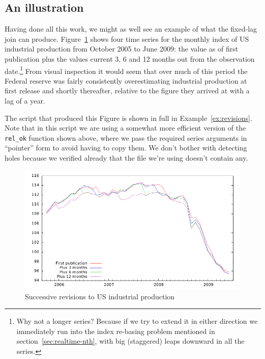 \subsection{An illustration}

Having done all this work, we might as well see an example of what the
fixed-lag join can produce.  Figure~\ref{fig:realtime-lag} shows four
time series for the monthly index of US industrial production from
October 2005 to June 2009: the value as of first publication plus the
values current 3, 6 and 12 months out from the observation
date.\footnote{Why not a longer series? Because if we try to extend it
  in either direction we immediately run into the index re-basing
  problem mentioned in section~\ref{sec:realtime-nth}, with big
  (staggered) leaps downward in all the series.} From visual
inspection it would seem that over much of this period the Federal
reserve was fairly consistently overestimating industrial production
at first release and shortly thereafter, relative to the figure they
arrived at with a lag of a year.

The script that produced this Figure is shown in full in
Example~\ref{ex:revisions}. Note that in this script we are using a
somewhat more efficient version of the \verb|rel_ok| function shown
above, where we pass the required series arguments in ``pointer'' form
to avoid having to copy them. We don't bother with detecting holes
because we verified already that the file we're using doesn't contain
any.

\begin{figure}[htbp]
  \centering
\includegraphics{figures/realtime}
  \caption{Successive revisions to US industrial production}
  \label{fig:realtime-lag}
\end{figure}

